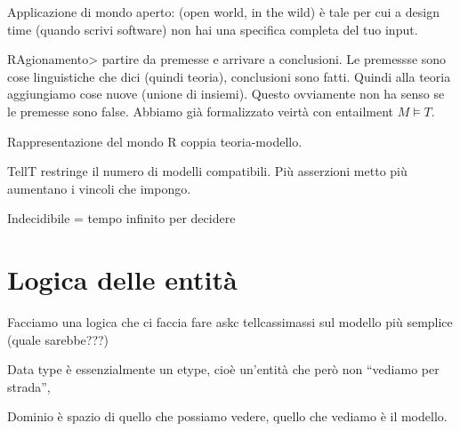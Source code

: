 Applicazione di mondo aperto: (open world, in the wild) è tale per cui
a design time (quando scrivi software) non hai una specifica completa
del tuo input.














































RAgionamento> partire da premesse e arrivare a conclusioni.
Le premessse sono cose linguistiche che dici (quindi teoria),
conclusioni sono fatti. Quindi alla teoria aggiungiamo cose
nuove (unione di insiemi). Questo ovviamente non ha senso se
le premesse sono false. Abbiamo già formalizzato veirtà con
entailment $M \vDash T$.

Rappresentazione del mondo R coppia teoria-modello.

TellT restringe il numero di modelli compatibili. Più asserzioni
metto più aumentano i vincoli che impongo.

Indecidibile = tempo infinito per decidere









\section{Logica delle entità}
Facciamo una logica che ci faccia fare askc tellcassimassi sul modello più semplice (quale sarebbe???)

Data type è essenzialmente un etype, cioè un'entità che però non ``vediamo per strada'', 

Dominio è spazio di quello che possiamo vedere, quello che vediamo è il modello.



